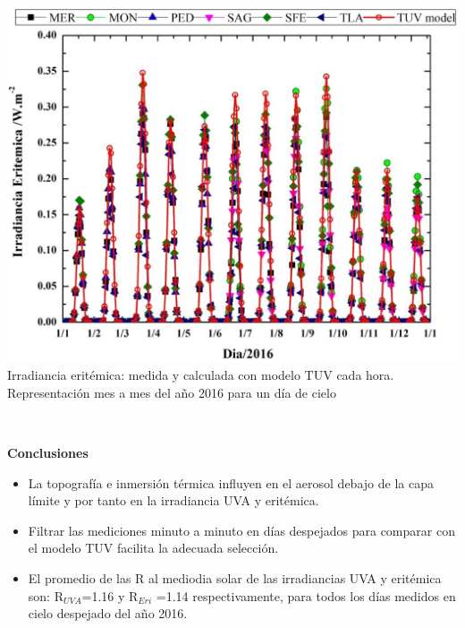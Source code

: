 \documentclass{article}
\begin{document}
\begin{minipage}{0.46\linewidth}
\includegraphics[scale=0.4]{images/erydia.eps}\\
\changefontsizes{9.5pt}
\textcolor{bl}{Irradiancia eritémica: medida y calculada con modelo TUV cada hora.
Representación mes a mes del año 2016 para un día de cielo}
\end{minipage}\vspace{0.1cm}\\
\begin{minipage}{0.50\linewidth}
\begin{center}
\begin{shaded}
\textbf{\textcolor{ver}{Conclusiones}}
\end{shaded}
\end{center}
\vspace{-0.85cm}
\begin{itemize}
    \item La topografía e inmersión térmica influyen en el aerosol debajo
de la capa límite y por tanto en la irradiancia UVA y eritémica.
    \item Filtrar las mediciones minuto a minuto en días despejados para
comparar con el modelo TUV facilita la adecuada selección.
\item El promedio de las R al mediodia solar de las irradiancias UVA y
eritémica son: R$_{UVA}$=1.16 y R$_{Eri}$ =1.14 respectivamente, para
todos los días medidos en cielo despejado del año 2016.
\end{itemize}
\end{minipage}
\hspace{1cm}\vspace{0.5cm}
\end{document}
